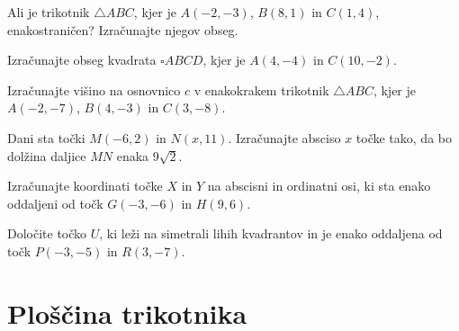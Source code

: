         \begin{naloga}
            Ali je trikotnik $\triangle ABC$, kjer je $A(-2,-3)$, $B(8,1)$ in $C(1,4)$, enakostraničen?
            Izračunajte njegov obseg. 
        \end{naloga}

        \begin{naloga}
            Izračunajte obseg kvadrata $\square ABCD$, kjer je $A(4,-4)$ in $C(10,-2)$. 
        \end{naloga}

        \begin{naloga}
            Izračunajte višino na osnovnico $c$ v enakokrakem trikotnik $\triangle ABC$, kjer je $A(-2,-7)$, $B(4,-3)$ in $C(3,-8)$. 
        \end{naloga}

        \begin{naloga}
            Dani sta točki $M(-6,2)$ in $N(x,11)$. Izračunajte absciso $x$ točke tako, da bo dolžina daljice $MN$ enaka $9\sqrt{2}$. 
        \end{naloga}

        \begin{naloga}
            Izračunajte koordinati točke $X$ in $Y$ na abscisni in ordinatni osi, ki sta enako oddaljeni od točk $G(-3,-6)$ in $H(9,6)$. 
        \end{naloga}

        \begin{naloga}
            Določite točko $U$, ki leži na simetrali lihih kvadrantov in je enako oddaljena od točk $P(-3,-5)$ in $R(3,-7)$. 
        \end{naloga}

    








\newpage

    \section{Ploščina trikotnika}

